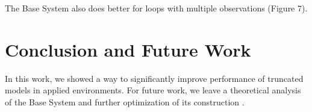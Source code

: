 \documentclass{acm_proc_article-sp}
\begin{document}
The Base System also does better for loops with multiple observations (Figure 7).


\section{Conclusion and Future Work}
In this work, we showed a way to significantly improve performance of truncated models in applied environments. For future work, we leave a theoretical analysis of the Base System and further optimization of its construction .

%

%
\end{document}
